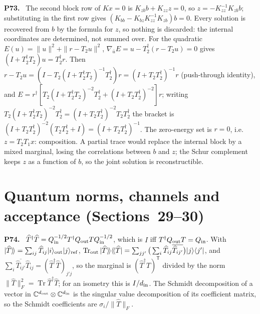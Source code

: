 \documentclass[11pt]{article}
\newcommand{\C}{\mathbb{C}}
\newcommand{\Tr}{\operatorname{Tr}}
\newenvironment{solution}[1]{\medskip\noindent\textbf{P#1.}\ }{\par\medskip}
\begin{document}
\begin{solution}{73}
The second block row of $Kx = 0$ is $K_{zb}b+K_{zz}z = 0$, so
$z = -K_{zz}^{-1}K_{zb}b$; substituting in the first row gives
$(K_{bb}-K_{bz}K_{zz}^{-1}K_{zb})b = 0$. Every solution is recovered from
$b$ by the formula for $z$, so nothing is discarded: the internal
coordinates are determined, not summed over. For the quadratic
$E(u) = \|u\|^2+\|r-T_2u\|^2$, $\nabla_{\bar u}E = u-T_2^\dagger(r-T_2u) = 0$
gives $(I+T_2^\dagger T_2)u = T_2^\dagger r$. Then $r-T_2u = (I-T_2(I+T_2^\dagger T_2)^{-1}T_2^\dagger)r = (I+T_2T_2^\dagger)^{-1}r$
(push-through identity), and
$E = r^\dagger[T_2(I+T_2^\dagger T_2)^{-2}T_2^\dagger+(I+T_2T_2^\dagger)^{-2}]r$;
writing $T_2(I+T_2^\dagger T_2)^{-2}T_2^\dagger = (I+T_2T_2^\dagger)^{-2}T_2T_2^\dagger$
the bracket is $(I+T_2T_2^\dagger)^{-2}(T_2T_2^\dagger+I) = (I+T_2T_2^\dagger)^{-1}$.
The zero-energy set is $r = 0$, i.e.\ $z = T_2T_1x$: composition. A partial
trace would replace the internal block by a mixed marginal, losing the
correlations between $b$ and $z$; the Schur complement keeps $z$ as a
function of $b$, so the joint solution is reconstructible.
\end{solution}

\section*{Quantum norms, channels and acceptance (Sections~29--30)}

\begin{solution}{74}
$\widehat T^\dagger\widehat T = Q_{\rm in}^{-1/2}T^\dagger Q_{\rm out}TQ_{\rm in}^{-1/2}$,
which is $I$ iff $T^\dagger Q_{\rm out}T = Q_{\rm in}$. With
$|\widehat T\rangle\!\rangle = \sum_{ij}\widehat T_{ij}|i\rangle_{\rm out}|j\rangle_{\rm ref}$,
$\Tr_{\rm out}|\widehat T\rangle\!\rangle\langle\!\langle\widehat T| = \sum_{jj'}\big(\sum_i\widehat T_{ij}\overline{\widehat T_{ij'}}\big)|j\rangle\langle j'|$,
and $\sum_i\overline{\widehat T_{ij'}}\widehat T_{ij} = (\widehat T^\dagger\widehat T)_{j'j}$,
so the marginal is $(\widehat T^\dagger\widehat T)^{\mathsf T}$ divided by the
norm $\|\widehat T\|_F^2 = \Tr\widehat T^\dagger\widehat T$; for an isometry this
is $I/d_{\rm in}$. The Schmidt decomposition of a vector in
$\C^{d_{\rm out}}\otimes\C^{d_{\rm in}}$ is the singular value decomposition of
its coefficient matrix, so the Schmidt coefficients are $\sigma_i/\|\widehat T\|_F$.
\end{solution}
\end{document}
